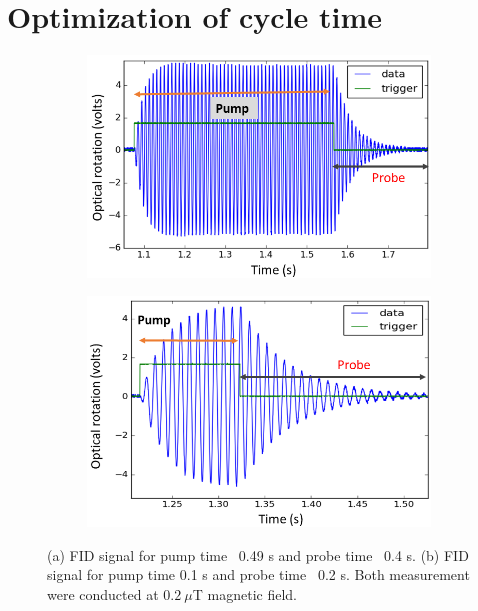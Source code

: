    \section{Optimization of cycle time} 
   \begin{figure}
    \centering
 
    \begin{subfigure}[b]{0.46\textwidth}
        \centering
        \includegraphics[width=\textwidth]{figures/Capture}
        \caption{}
        \label{fig:pump long}
    \end{subfigure}
    \hfill
    \begin{subfigure}[b]{0.45\textwidth}
        \centering
        \includegraphics[width=\textwidth]{figures/FID_optimized.png}
        \caption{}
        \label{fig:pump short}
    \end{subfigure}
    \caption{(a) FID signal for pump time~ 0.49 s and probe time~ 0.4 s. (b) FID signal for pump time  0.1 s and probe time ~0.2 s. Both measurement were conducted at $0.2~\mu$T magnetic field.}
    \label{fig:pump time}
\end{figure} 
